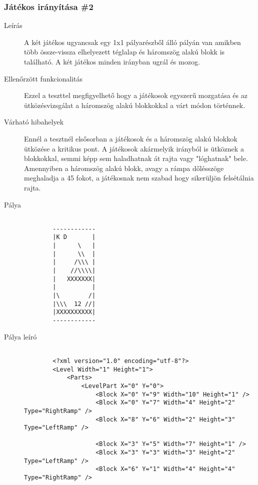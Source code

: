 \subsubsection{Játékos irányítása \#2}
\begin{description}
	
	\item[Leírás] A két játékos ugyancsak egy 1x1 pályarészből álló pályán van amikben több össze-vissza elhelyezett téglalap és háromszög alakú blokk is található. A két játékos minden irányban ugrál és mozog.
	
	\item[Ellenőrzött funkcionalitás] Ezzel a teszttel megfigyelhető hogy a játékosok egyszerű mozgatása és az ütközésvizsgálat a háromszög alakú blokkokkal a várt módon történnek.
	
	\item[Várható hibahelyek] Ennél a tesztnél elsősorban a játékosok és a háromszög alakú blokkok ütközése a kritikus pont. A játékosok akármelyik irányból is ütköznek a blokkokkal, semmi képp sem haladhatnak át rajta vagy "lóghatnak" bele. Amennyiben a háromszög alakú blokk, avagy a rámpa dőlésszöge meghaladja a 45 fokot, a játékosnak nem szabad hogy sikerüljön felsétálnia rajta.

	\item[Pálya]
	\begin{verbatim}
	
		------------
		|K D       |
		|      \   |
		|      \\  |
		|     /\\\ |
		|    //\\\\|
		|   XXXXXXX|
		|          |
		|\        /|
		|\\\  12 //|
		|XXXXXXXXXX|
		------------
	\end{verbatim}

	\item[Pálya leíró]
	\begin{verbatim}
	
		<?xml version="1.0" encoding="utf-8"?>
		<Level Width="1" Height="1">
		    <Parts>
		        <LevelPart X="0" Y="0">
		            <Block X="0" Y="9" Width="10" Height="1" />
		            <Block X="0" Y="7" Width="4" Height="2" Type="RightRamp" />
		            <Block X="8" Y="6" Width="2" Height="3" Type="LeftRamp" />
					
		            <Block X="3" Y="5" Width="7" Height="1" />
		            <Block X="3" Y="3" Width="3" Height="2" Type="LeftRamp" />
		            <Block X="6" Y="1" Width="4" Height="4" Type="RightRamp" />
					

\end{verbatim}
\end{description}

